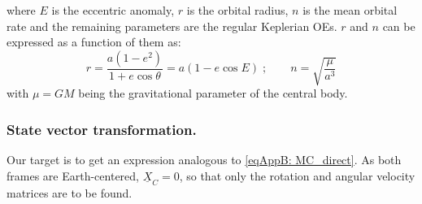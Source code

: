 		\noindent where $E$ is the eccentric anomaly, $r$ is the orbital radius, $n$ is the mean orbital rate and the remaining parameters are the regular Keplerian OEs. $r$ and $n$ can be expressed as a function of them as:
		\[
		r = \dfrac{a (1 - e^2)}{1 + e \cos\theta} = a (1 - e\cos E) \; ; \qquad n = \sqrt{\dfrac{\mu }{a^3}}		
		\]
		\noindent with $\mu = GM$ being the gravitational parameter of the central body.
		\subsubsection{State vector transformation.}
		\indent Our target is to get an expression analogous to \eqref{eqAppB: 	MC_direct}. As both frames are Earth-centered, $\underline{X}_C = 0$, so that only the rotation and angular velocity matrices are to be found.
